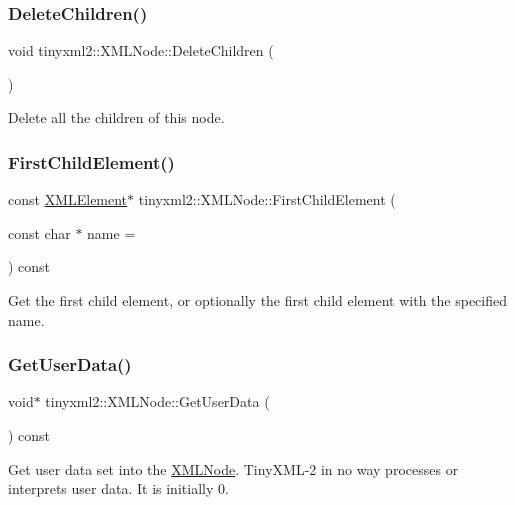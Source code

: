 \subsubsection{\texorpdfstring{DeleteChildren()}{DeleteChildren()}}
{\footnotesize\ttfamily void tinyxml2\+::\+X\+M\+L\+Node\+::\+Delete\+Children (\begin{DoxyParamCaption}{ }\end{DoxyParamCaption})}

Delete all the children of this node. \mbox{\label{classtinyxml2_1_1XMLNode_a1795a35852dc8aae877cc8ded986e59b}} 
\subsubsection{\texorpdfstring{FirstChildElement()}{FirstChildElement()}}
{\footnotesize\ttfamily const \mbox{\hyperlink{classtinyxml2_1_1XMLElement}{X\+M\+L\+Element}}$\ast$ tinyxml2\+::\+X\+M\+L\+Node\+::\+First\+Child\+Element (\begin{DoxyParamCaption}\item[{const char $\ast$}]{name = {} }\end{DoxyParamCaption}) const}

Get the first child element, or optionally the first child element with the specified name. \mbox{\label{classtinyxml2_1_1XMLNode_a7f0687574afa03bc479dc44f29db0afe}} 
\subsubsection{\texorpdfstring{GetUserData()}{GetUserData()}}
{\footnotesize\ttfamily void$\ast$ tinyxml2\+::\+X\+M\+L\+Node\+::\+Get\+User\+Data (\begin{DoxyParamCaption}{ }\end{DoxyParamCaption}) const\hspace{0.3cm}{\ttfamily [inline]}}

Get user data set into the \mbox{\hyperlink{classtinyxml2_1_1XMLNode}{X\+M\+L\+Node}}. Tiny\+X\+M\+L-\/2 in no way processes or interprets user data. It is initially 0. \mbox{\label{classtinyxml2_1_1XMLNode_a85adb8f0b7477eec30f9a41d420b09c2}} 
